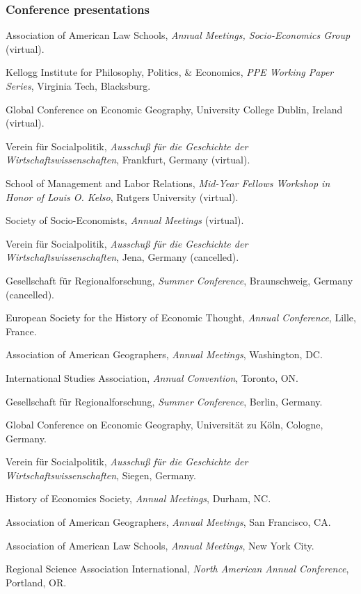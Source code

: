 \documentclass[letter,11pt]{article}
\newlength{\cvlabelw}
\newenvironment{cvlist}[1][2.5cm]{%
  \setlength{\cvlabelw}{#1}%
  \begin{list}{}{%
    \setlength{\leftmargin}{\cvlabelw}\setlength{\labelwidth}{\cvlabelw}%
    \setlength{\labelsep}{0pt}\setlength{\itemindent}{0pt}\setlength{\listparindent}{0pt}%
    \setlength{\itemsep}{4pt}\setlength{\parsep}{0pt}\setlength{\topsep}{3pt}\setlength{\partopsep}{0pt}%
    \renewcommand{\makelabel}[1]{##1\hfil}}}{\end{list}}
\begin{document}
\subsubsection*{Conference presentations}
\begin{cvlist}
\item[2022] Association of American Law Schools, \emph{Annual Meetings, Socio-Economics Group} (virtual).

Kellogg Institute for Philosophy, Politics, \& Economics, \emph{PPE Working Paper Series}, Virginia Tech, Blacksburg.

Global Conference on Economic Geography, University College Dublin, Ireland (virtual).
\item[2021] Verein f\"{u}r Socialpolitik, \emph{Ausschu{\ss} f\"{u}r die Geschichte der Wirtschaftswissenschaften}, Frankfurt, Germany (virtual).

School of Management and Labor Relations, \emph{Mid-Year Fellows Workshop in Honor of Louis O. Kelso}, Rutgers University (virtual).

Society of Socio-Economists, \emph{Annual Meetings} (virtual).
\item[2020] Verein f\"{u}r Socialpolitik, \emph{Ausschu{\ss} f\"{u}r die Geschichte der Wirtschaftswissenschaften}, Jena, Germany (cancelled).

Gesellschaft f\"{u}r Regionalforschung, \emph{Summer Conference}, Braunschweig, Germany (cancelled).
\item[2019] European Society for the History of Economic Thought, \emph{Annual Conference}, Lille, France.

Association of American Geographers, \emph{Annual Meetings}, Washington, DC.

International Studies Association, \emph{Annual Convention}, Toronto, ON.
\item[2018] Gesellschaft f\"{u}r Regionalforschung, \emph{Summer Conference}, Berlin, Germany.

Global Conference on Economic Geography, Universit\"{a}t zu K\"{o}ln, Cologne, Germany.
\item[2017] Verein f\"{u}r Socialpolitik, \emph{Ausschu{\ss} f\"{u}r die Geschichte der Wirtschaftswissenschaften}, Siegen, Germany.
\item[2016] History of Economics Society, \emph{Annual Meetings}, Durham, NC.

Association of American Geographers, \emph{Annual Meetings}, San Francisco, CA.

Association of American Law Schools, \emph{Annual Meetings}, New York City.
\item[2015] Regional Science Association International, \emph{North American Annual Conference}, Portland, OR.


\end{cvlist}
\end{document}
